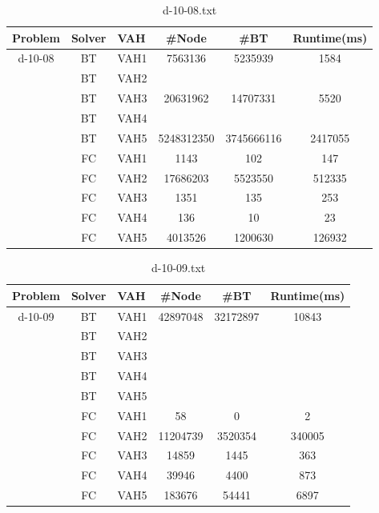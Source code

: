 \documentclass{article}
\begin{document}
\begin{table}[]
\caption{d-10-08.txt}
\label{tab:my-table}
\begin{tabular}{|c|c|c|c|c|c|}
\hline
Problem & Solver & \multicolumn{1}{l|}{VAH} & \#Node & \#BT & \multicolumn{1}{l|}{Runtime(ms)} \\ \hline
\multirow{10}{*}{d-10-08} & BT & VAH1 & 7563136 & 5235939 & 1584 \\ \cline{2-6} 
 & BT & VAH2 &  &  &  \\ \cline{2-6} 
 & BT & VAH3 & 20631962 & 14707331 & 5520 \\ \cline{2-6} 
 & BT & VAH4 &  &  &  \\ \cline{2-6} 
 & BT & VAH5 & 5248312350 & 3745666116 & 2417055 \\ \cline{2-6} 
 & FC & VAH1 & 1143 & 102 & 147 \\ \cline{2-6} 
 & FC & VAH2 & 17686203 & 5523550 & 512335 \\ \cline{2-6} 
 & FC & VAH3 & 1351 & 135 & 253 \\ \cline{2-6} 
 & FC & VAH4 & 136 & 10 & 23 \\ \cline{2-6} 
 & FC & VAH5 & 4013526 & 1200630 & 126932 \\ \hline
\end{tabular}
\end{table}

\begin{table}[]
\caption{d-10-09.txt}
\label{tab:my-table}
\begin{tabular}{|c|c|c|c|c|c|}
\hline
Problem & Solver & \multicolumn{1}{l|}{VAH} & \#Node & \#BT & \multicolumn{1}{l|}{Runtime(ms)} \\ \hline
\multirow{10}{*}{d-10-09} & BT & VAH1 & 42897048 & 32172897 & 10843 \\ \cline{2-6} 
 & BT & VAH2 &  &  &  \\ \cline{2-6} 
 & BT & VAH3 &  &  &  \\ \cline{2-6} 
 & BT & VAH4 &  &  &  \\ \cline{2-6} 
 & BT & VAH5 &  &  &  \\ \cline{2-6} 
 & FC & VAH1 & 58 & 0 & 2 \\ \cline{2-6} 
 & FC & VAH2 & 11204739 & 3520354 & 340005 \\ \cline{2-6} 
 & FC & VAH3 & 14859 & 1445 & 363 \\ \cline{2-6} 
 & FC & VAH4 & 39946 & 4400 & 873 \\ \cline{2-6} 
 & FC & VAH5 & 183676 & 54441 & 6897 \\ \hline
\end{tabular}
\end{table}
\end{document}
